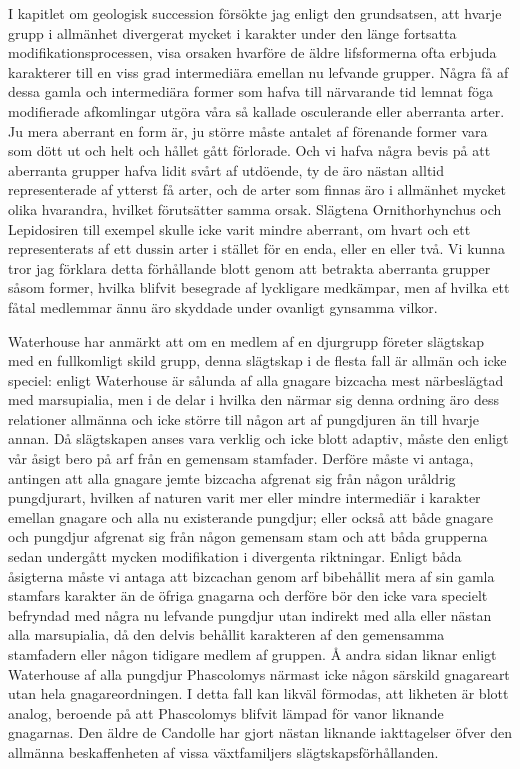 I kapitlet om geologisk succession försökte jag enligt den grundsatsen, att hvarje grupp i allmänhet divergerat mycket i karakter under den länge fortsatta modifikationsprocessen, visa orsaken hvarföre de äldre lifsformerna ofta erbjuda karakterer till en viss grad intermediära emellan nu lefvande grupper. Några få af dessa gamla och intermediära former som hafva till närvarande tid lemnat föga modifierade afkomlingar utgöra våra så kallade osculerande eller aberranta arter. Ju mera aberrant en form är, ju större måste antalet af förenande former vara som dött ut och helt och hållet gått förlorade. Och vi hafva några bevis på att aberranta grupper hafva lidit svårt af utdöende, ty de äro nästan alltid representerade af ytterst få arter, och de arter som finnas äro i allmänhet mycket olika hvarandra, hvilket förutsätter samma orsak. Slägtena Ornithorhynchus och Lepidosiren till exempel skulle icke varit mindre aberrant, om hvart och ett representerats af ett dussin arter i stället för en enda, eller en eller två. Vi kunna tror jag förklara detta förhållande blott genom att betrakta aberranta grupper såsom former, hvilka blifvit besegrade af lyckligare medkämpar, men af hvilka ett fåtal medlemmar ännu äro skyddade under ovanligt gynsamma vilkor.

Waterhouse har anmärkt att om en medlem af en djurgrupp företer slägtskap med en fullkomligt skild grupp, denna slägtskap i de flesta fall är allmän och icke speciel: enligt Waterhouse är sålunda af alla gnagare bizcacha mest närbeslägtad med marsupialia, men i de delar i hvilka den närmar sig denna ordning äro dess relationer allmänna och icke större till någon art af pungdjuren än till hvarje annan. Då slägtskapen anses vara verklig och icke blott adaptiv, måste den enligt vår åsigt bero på arf från en gemensam stamfader. Derföre måste vi antaga, antingen att alla gnagare jemte bizcacha afgrenat sig från någon uråldrig pungdjurart, hvilken af naturen varit mer eller mindre intermediär i karakter emellan gnagare och alla nu existerande pungdjur; eller också att både gnagare och pungdjur afgrenat sig från någon gemensam stam och att båda grupperna sedan undergått mycken modifikation i divergenta riktningar. Enligt båda åsigterna måste vi antaga att bizcachan genom arf bibehållit mera af sin gamla stamfars karakter än de öfriga gnagarna och derföre bör den icke vara specielt befryndad med några nu lefvande pungdjur utan indirekt med alla eller nästan alla marsupialia, då den delvis behållit karakteren af den gemensamma stamfadern eller någon tidigare medlem af gruppen. Å andra sidan liknar enligt Waterhouse af alla pungdjur Phascolomys närmast icke någon särskild gnagareart utan hela gnagareordningen. I detta fall kan likväl förmodas, att likheten är blott analog, beroende på att Phascolomys blifvit lämpad för vanor liknande gnagarnas. Den äldre de Candolle har gjort nästan liknande iakttagelser öfver den allmänna beskaffenheten af vissa växtfamiljers slägtskapsförhållanden.

